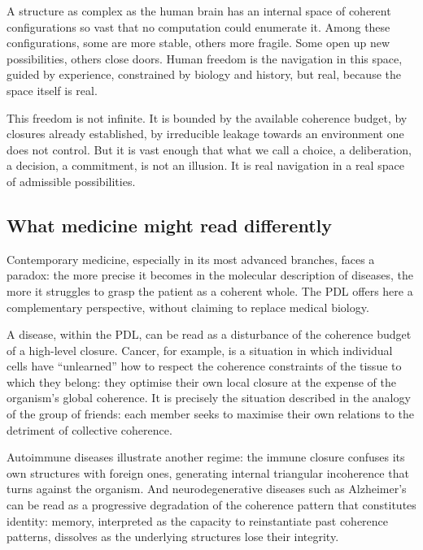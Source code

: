 \documentclass[11pt, a4paper, openright]{book}
\begin{document}
A structure as complex as the human brain has an internal space of coherent configurations so vast that no computation could enumerate it. Among these configurations, some are more stable, others more fragile. Some open up new possibilities, others close doors. Human freedom is the navigation in this space, guided by experience, constrained by biology and history, but real, because the space itself is real.

\medskip

This freedom is not infinite. It is bounded by the available coherence budget, by closures already established, by irreducible leakage towards an environment one does not control. But it is vast enough that what we call a choice, a deliberation, a decision, a commitment, is not an illusion. It is real navigation in a real space of admissible possibilities.

\subsection*{What medicine might read differently}

Contemporary medicine, especially in its most advanced branches, faces a paradox: the more precise it becomes in the molecular description of diseases, the more it struggles to grasp the patient as a coherent whole. The PDL offers here a complementary perspective, without claiming to replace medical biology.

\medskip

A disease, within the PDL, can be read as a disturbance of the coherence budget of a high-level closure. Cancer, for example, is a situation in which individual cells have “unlearned” how to respect the coherence constraints of the tissue to which they belong: they optimise their own local closure at the expense of the organism’s global coherence. It is precisely the situation described in the analogy of the group of friends: each member seeks to maximise their own relations to the detriment of collective coherence.

\medskip

Autoimmune diseases illustrate another regime: the immune closure confuses its own structures with foreign ones, generating internal triangular incoherence that turns against the organism. And neurodegenerative diseases such as Alzheimer’s can be read as a progressive degradation of the coherence pattern that constitutes identity: memory, interpreted as the capacity to reinstantiate past coherence patterns, dissolves as the underlying structures lose their integrity.
\end{document}
